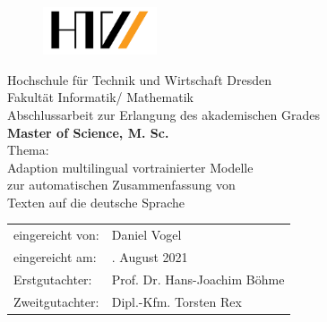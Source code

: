 \begin{titlepage}

\begin{figure}[t]
 \centering
 \includegraphics[width=0.3\textwidth]{./source/images/htwdresden.png}
\end{figure}

\begin{center}
\large{Hochschule für Technik und Wirtschaft Dresden} \\[1ex]
\large{Fakultät Informatik/ Mathematik} \\[11ex]
\Large{Abschlussarbeit zur Erlangung des akademischen Grades} \\[2ex]
\LARGE{\textbf{Master of Science, M. Sc.}} \\[8ex]
\Large{Thema:} \\[1ex]
\Large{Adaption multilingual vortrainierter Modelle} \\[1ex]
\Large{zur automatischen Zusammenfassung von} \\[1ex]
\Large{Texten auf die deutsche Sprache} \\[11ex]
\end{center}

\begin{flushleft}
\begin{tabular}{ll}
eingereicht von: & \quad Daniel Vogel \\[2ex]
eingereicht am: & \quad 8. August 2021 \\[2ex]
Erstgutachter:  & \quad Prof. Dr. Hans-Joachim Böhme \\[2ex]
Zweitgutachter: & \quad Dipl.-Kfm. Torsten Rex \\[2ex]
\end{tabular}
\end{flushleft}

\end{titlepage}
